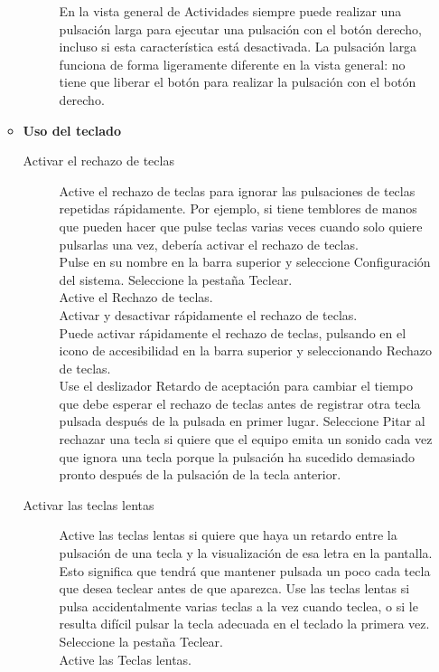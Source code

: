 \documentclass[12pt,letterpaper]{book}
\begin{document}
\begin{itemize}
\begin{itemize}
\begin{description}
En la vista general de Actividades siempre puede realizar una pulsación larga para ejecutar una pulsación con el botón derecho, incluso si esta característica está desactivada. La pulsación larga funciona de forma ligeramente diferente en la vista general: no tiene que liberar el botón para realizar la pulsación con el botón derecho.
			\end{description}
		\item {\large \bf Uso del teclado}
			\begin{description}
				\item[Activar el rechazo de teclas] Active el rechazo de teclas para ignorar las pulsaciones de teclas repetidas rápidamente. Por ejemplo, si tiene temblores de manos que pueden hacer que pulse teclas varias veces cuando solo quiere pulsarlas una vez, debería activar el rechazo de teclas.\\
Pulse en su nombre en la barra superior y seleccione Configuración del sistema.
Seleccione la pestaña Teclear.\\
Active el Rechazo de teclas.\\

Activar y desactivar rápidamente el rechazo de teclas.\\
Puede activar rápidamente el rechazo de teclas, pulsando en el icono de accesibilidad en la barra superior y seleccionando Rechazo de teclas.\\

Use el deslizador Retardo de aceptación para cambiar el tiempo que debe esperar el rechazo de teclas antes de registrar otra tecla pulsada después de la pulsada en primer lugar. Seleccione Pitar al rechazar una tecla si quiere que el equipo emita un sonido cada vez que ignora una tecla porque la pulsación ha sucedido demasiado pronto después de la pulsación de la tecla anterior.
				\item[Activar las teclas lentas] Active las teclas lentas si quiere que haya un retardo entre la pulsación de una tecla y la visualización de esa letra en la pantalla. Esto significa que tendrá que mantener pulsada un poco cada tecla que desea teclear antes de que aparezca. Use las teclas lentas si pulsa accidentalmente varias teclas a la vez cuando teclea, o si le resulta difícil pulsar la tecla adecuada en el teclado la primera vez.\\
				
Seleccione la pestaña Teclear.\\
Active las Teclas lentas.\\


\end{description}
\end{itemize}
\end{itemize}
\end{document}

